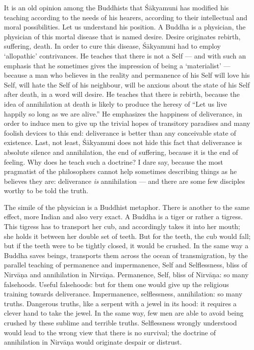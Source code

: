 \documentclass[a4paper, 11pt, oneside, english, landscape]{article}
\begin{document}
It is an old opinion among the Buddhists that Śākyamuni has modified his teaching according to the needs of his hearers, according to their intellectual and moral possibilities. Let us understand his position. A Buddha is a physician, the physician of this mortal disease that is named desire. Desire originates rebirth, suffering, death. In order to cure this disease, Śākyamuni had to employ `allopathic' contrivances. He teaches that there is not a Self --- and with such an emphasis that he sometimes gives the impression of being a `materialist' --- because a man who believes in the reality and permanence of his Self will love his Self, will hate the Self of his neighbour, will be anxious about the state of his Self after death, in a word will desire. He teaches that there is rebirth, because the idea of annihilation at death is likely to produce the heresy of ``Let us live happily so long as we are alive.'' He emphasizes the happiness of deliverance, in order to induce men to give up the trivial hopes of transitory paradises and many foolish devices to this end: deliverance is better than any conceivable state of existence. Last, not least, Śākyamuni does not hide this fact that deliverance is absolute silence and annihilation, the end of suffering, because it is the end of feeling. Why does he teach such a doctrine? I dare say, because the most pragmatist of the philosophers cannot help sometimes describing things as he believes they are: deliverance \emph{is} annihilation --- and there are some few disciples worthy to be told the truth.

The simile of the physician is a Buddhist metaphor. There is another to the same effect, more Indian and also very exact. A Buddha is a tiger or rather a tigress. This tigress has to transport her cub, and accordingly takes it into her mouth; she holds it between her double set of teeth. But for the teeth, the cub would fall; but if the teeth were to be tightly closed, it would be crushed. In the same way a Buddha saves beings, transports them across the ocean of transmigration, by the parallel teaching of permanence and impermanence, Self and Selflessness, bliss of Nirvāṇa and annihilation in Nirvāṇa. Permanence, Self, bliss of Nirvāṇa: so many falsehoods. Useful falsehoods: but for them one would give up the religious training towards deliverance. Impermanence, selflessness, annihilation: so many truths. Dangerous truths, like a serpent with a jewel in its hood: it requires a clever hand to take the jewel. In the same way, few men are able to avoid being crushed by these sublime and terrible truths. Selflessness wrongly understood would lead to the wrong view that there is no survival; the doctrine of annihilation in Nirvāṇa would originate despair or distrust.
\end{document}
